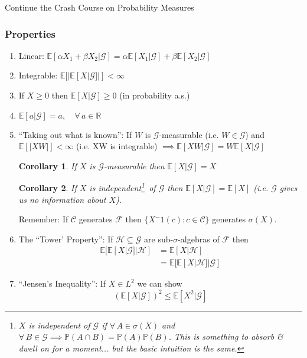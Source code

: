 \documentclass[12pt]{article}
\newtheorem{corollary}{Corollary}
\begin{document}
\begin{section}{Continue the Crash Course on Probability Measures}
\subsubsection{Properties} 
\begin{enumerate}
	\item Linear: $\mathbb E[\alpha X_1 + \beta X_2 | \mathcal G] = \alpha \mathbb E[X_1|\mathcal G] + \beta\mathbb E[X_2|\mathcal G]$
	\item Integrable: $\mathbb E[|\mathbb E[X|\mathcal G]|] < \infty$
	\item If $X \geq 0$ then $\mathbb E[X|\mathcal G] \geq 0$ (in probability a.s.)
	\item $\mathbb E[a|\mathcal G] = a, \quad \forall\,a\in\mathbb R$
	\item ``Taking out what is known'': If $W$ is $\mathcal G$-measurable (i.e. $W \in \mathcal G$) and $\mathbb E[|XW|] < \infty$ (i.e. XW is integrable) $\implies \mathbb E[XW|\mathcal G] = W\mathbb E[X|\mathcal G]$
\begin{corollary} If $X$ is $\mathcal G$-measurable then $\mathbb E[X|\mathcal G] = X$
\end{corollary}
\begin{corollary} If $X$ is independent\footnote{$X$ is independent of $\mathcal G$ if $\forall\,A\in\sigma(X)$ and $\forall\,B\in\mathcal G \implies \mathbb P(A\cap B) = \mathbb P(A)\mathbb P(B)$. This is something to absorb \& dwell on for a moment... but the basic intuition is the same.}~of $\mathcal G$ then $\mathbb E[X|\mathcal G] = \mathbb E[X]$ (i.e. $\mathcal G$ gives us no information about $X$).
\end{corollary}
Remember: If $\mathcal C$ generates $\mathcal F$ then $\{X^-1(c):c\in\mathcal C\}$ generates $\sigma(X)$.
	\item The ``Tower' Property'': If $\mathcal H \subseteq \mathcal G$ are sub-$\sigma$-algebras of $\mathcal F$ then
		\begin{align*}
			\mathbb E[\mathbb E[X|\mathcal G]|\mathcal H] &= \mathbb E[X|\mathcal H] \\
			&= \mathbb E[\mathbb E[X|\mathcal H]|\mathcal G]
		\end{align*}
	\item ``Jensen's Inequality'': If $X \in L^2$ we can show
		\begin{equation*}
			(\mathbb E[X|\mathcal G])^2 \leq \mathbb E[X^2|\mathcal G]
		\end{equation*}
\end{enumerate}


\end{section}
\end{document}
